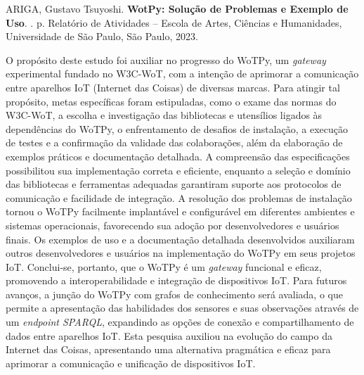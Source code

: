 
\setlength{\absparsep}{18pt} %
\begin{resumo}

% 
%
% 
%
\begin{flushleft}
ARIGA, Gustavo Tsuyoshi. \textbf{WotPy: Solução de Problemas e Exemplo de Uso}. \imprimirdata. \pageref{LastPage} p. Relatório de Atividades – Escola de Artes, Ciências e Humanidades, Universidade de São Paulo, São Paulo, 2023. \end{flushleft}


O propósito deste estudo foi auxiliar no progresso do WoTPy, um \textit{gateway} experimental fundado no W3C-WoT, com a intenção de aprimorar a comunicação entre aparelhos IoT (Internet das Coisas) de diversas marcas. Para atingir tal propósito, metas específicas foram estipuladas, como o exame das normas do W3C-WoT, a escolha e investigação das bibliotecas e utensílios ligados às dependências do WoTPy, o enfrentamento de desafios de instalação, a execução de testes e a confirmação da validade das colaborações, além da elaboração de exemplos práticos e documentação detalhada. A compreensão das especificações possibilitou sua implementação correta e eficiente, enquanto a seleção e domínio das bibliotecas e ferramentas adequadas garantiram suporte aos protocolos de comunicação e facilidade de integração. A resolução dos problemas de instalação tornou o WoTPy facilmente implantável e configurável em diferentes ambientes e sistemas operacionais, favorecendo sua adoção por desenvolvedores e usuários finais. Os exemplos de uso e a documentação detalhada desenvolvidos auxiliaram outros desenvolvedores e usuários na implementação do WoTPy em seus projetos IoT. Conclui-se, portanto, que o WoTPy é um \textit{gateway} funcional e eficaz, promovendo a interoperabilidade e integração de dispositivos IoT. Para futuros avanços, a junção do WoTPy com grafos de conhecimento será avaliada, o que permite a apresentação das habilidades dos sensores e suas observações através de um \textit{endpoint SPARQL}, expandindo as opções de conexão e compartilhamento de dados entre aparelhos IoT. Esta pesquisa auxiliou na evolução do campo da Internet das Coisas, apresentando uma alternativa pragmática e eficaz para aprimorar a comunicação e unificação de dispositivos IoT.


\end{resumo}
